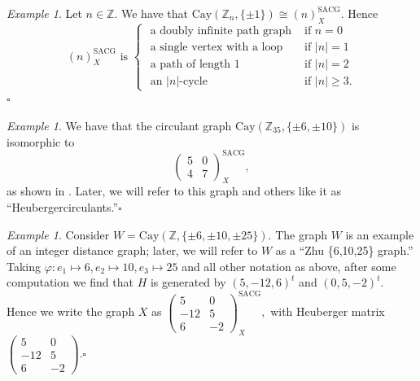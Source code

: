\documentclass{article}
\renewcommand{\phi}{\varphi}
\theoremstyle{definition}
\theoremstyle{remark}
\newtheorem{Ex}[Thm]{Example}
\begin{document}
\begin{Ex}\label{example-cycle} Let $n\in\mathbb{Z}$.  We have that $\text{Cay}(\mathbb{Z}_n,\{\pm 1\})\cong (n)^{\text{SACG}}_X$.   Hence \[(n)^{\text{SACG}}_X\text{ is }\begin{cases}
\text{ a doubly infinite path graph } & \text{if }n=0\\

\text{ a single vertex with a loop } & \text{if }|n|=1\\

\text{ a path of length }1 & \text{if }|n|=2\\

\text{ an }|n|\text{-cycle} & \text{if }|n|\geq 3.\end{cases}\]\hfill $\square$ \end{Ex}

\vspace{.1in}

\begin{Ex}\label{example-circulant}We have that the circulant graph $\text{Cay}(\mathbb{Z}_{35},\{\pm 6,\pm 10\})$ is isomorphic to \[\begin{pmatrix}5 & 0\\
4 & 7\end{pmatrix}^{\text{SACG}}_X,\] as shown in \cite[Example 12]{Heuberger}.  Later, we will refer to this graph and others like it as ``Heuberger\linebreak circulants.''\hfill $\square$\end{Ex}

\vspace{.1in}

\begin{Ex}\label{example-MX}Consider $W=\text{Cay}(\mathbb{Z},\{\pm6,\pm10,\pm25\})$.  The graph $W$ is an example of an integer distance graph; later, we will refer to $W$ as a ``Zhu \{6,10,25\} graph.''  Taking $\phi\colon e_1\mapsto 6, e_2\mapsto 10, e_3\mapsto 25$ and all other notation as above, after some computation we find that $H$ is generated by $(5,-12,6)^t$ and $(0,5,-2)^t$.  Hence we write the graph $X$ as \(\begin{pmatrix}
5 & 0\\
-12 & 5\\
6 & -2
\end{pmatrix}^{\text{SACG}}_X,\)  with Heuberger matrix \(\begin{pmatrix}5 & 0\\
-12 & 5\\
6 & -2\end{pmatrix}.\)\hfill $\square$
\end{Ex}
\end{document}
